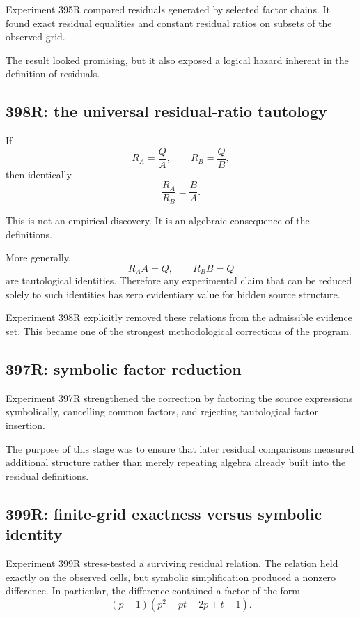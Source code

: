 \documentclass[11pt,a4paper]{article}
\begin{document}
Experiment 395R compared residuals generated by selected factor chains. It found exact residual equalities and constant residual ratios on subsets of the observed grid.

The result looked promising, but it also exposed a logical hazard inherent in the definition of residuals.

\subsection{398R: the universal residual-ratio tautology}
\label{sec:tautology}

If
\[
R_A=\frac{Q}{A},
\qquad
R_B=\frac{Q}{B},
\]
then identically
\[
\boxed{
\frac{R_A}{R_B}=\frac{B}{A}.
}
\]

This is not an empirical discovery. It is an algebraic consequence of the definitions.

More generally,
\[
R_A A=Q,
\qquad
R_B B=Q
\]
are tautological identities. Therefore any experimental claim that can be reduced solely to such identities has zero evidentiary value for hidden source structure.

Experiment 398R explicitly removed these relations from the admissible evidence set. This became one of the strongest methodological corrections of the program.

\subsection{397R: symbolic factor reduction}

Experiment 397R strengthened the correction by factoring the source expressions symbolically, cancelling common factors, and rejecting tautological factor insertion.

The purpose of this stage was to ensure that later residual comparisons measured additional structure rather than merely repeating algebra already built into the residual definitions.

\subsection{399R: finite-grid exactness versus symbolic identity}

Experiment 399R stress-tested a surviving residual relation. The relation held exactly on the observed cells, but symbolic simplification produced a nonzero difference. In particular, the difference contained a factor of the form
\[
(p-1)(p^2-pt-2p+t-1).
\]
\end{document}
